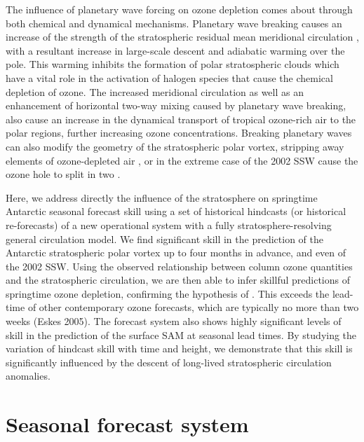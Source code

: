 The influence of planetary wave forcing on ozone depletion comes about through
both chemical and dynamical mechanisms. Planetary wave breaking causes an
increase of the strength of the stratospheric residual mean meridional
circulation \citep{Haynes1991}, with a resultant increase in large-scale descent
and adiabatic warming over the pole. This warming inhibits the formation of
polar stratospheric clouds which have a vital role in the activation of halogen
species that cause the chemical depletion of ozone. The increased meridional
circulation as well as an enhancement of horizontal two-way mixing caused by
planetary wave breaking, also cause an increase in the dynamical transport of
tropical ozone-rich air to the polar regions, further increasing ozone
concentrations.  Breaking planetary waves can also modify the geometry of the
stratospheric polar vortex, stripping away elements of ozone-depleted air
\citep{Waugh1994}, or in the extreme case of the 2002 SSW cause the ozone hole
to split in two \citep{Charlton2005a}.

Here, we address directly the influence of the stratosphere on springtime
Antarctic seasonal forecast skill using a set of historical hindcasts (or
historical re-forecasts) of a new operational system with a fully
stratosphere-resolving general circulation model. We find significant skill in
the prediction of the Antarctic stratospheric polar vortex up to four months in
advance, and even of the 2002 SSW. Using the observed relationship between
column ozone quantities and the stratospheric circulation, we are then able to
infer skillful predictions of springtime ozone depletion, confirming the
hypothesis of \citet{Salby2012}. This exceeds the lead-time of other
contemporary ozone forecasts, which are typically no more than two weeks (Eskes
2005). The forecast system also shows highly significant levels of skill in the
prediction of the surface SAM at seasonal lead times. By studying the variation
of hindcast skill with time and height, we demonstrate that this skill is
significantly influenced by the descent of long-lived stratospheric circulation
anomalies.




\section{Seasonal forecast system}


